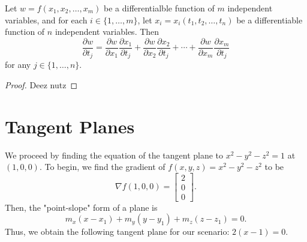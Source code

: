 %
%    
\begin{theorem}
    Let $w = f(x_1, x_2, \dots, x_m)$ be a differentialble function of $m$
    independent variables, and for each $i \in \{1,\dots,m\}$, let
    $x_i = x_i(t_1,t_2,\dots,t_n)$ be a differentiable function of $n$
    independent variables. Then
    $$\dfrac{\partial w}{\partial t_j} = \dfrac{\partial w}{\partial x_1}
    \dfrac{\partial x_1}{\partial t_j}+
    \dfrac{\partial w}{\partial x_2}\dfrac{\partial x_2}{\partial t_j}+\cdots
    +\dfrac{\partial w}{\partial x_m}\dfrac{\partial x_m}{\partial t_j}$$
    for any $j\in \{1,\dots,n\}$.
\end{theorem}
\begin{proof}
   Deez nutz 
\end{proof}

\section{Tangent Planes}
We proceed by finding the equation of the tangent plane to $x^2-y^2-z^2=1$ at
$(1,0,0)$. To begin, we find the gradient of $f(x,y,z)=x^2-y^2-z^2$ to be
$$\nabla f(1,0,0) = \begin{bmatrix} 2 \\ 0 \\ 0 \end{bmatrix}.$$ Then, the "point-slope"
form of a plane is $$m_x(x-x_1)+m_y(y-y_1)+m_z(z-z_1)=0.$$ Thus, we obtain
the following tangent plane for our scenario: $2(x-1)=0$.

